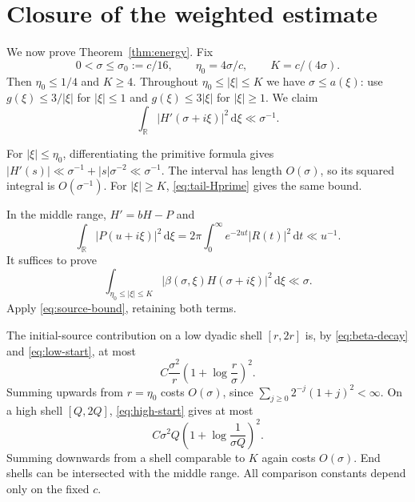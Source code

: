 \documentclass[11pt,letterpaper]{article}
\numberwithin{equation}{section}
\theoremstyle{definition}
\theoremstyle{remark}
\newcommand{\R}{\mathbb R}
\newcommand{\dd}{\,\mathrm d}
\begin{document}
\section{Closure of the weighted estimate}\label{sec:closure}

We now prove Theorem~\ref{thm:energy}. Fix
\begin{equation}\label{eq:threshold}
 0<\sigma\le\sigma_0:=c/16,\qquad
 \eta_0=4\sigma/c,\qquad K=c/(4\sigma).
\end{equation}
Then $\eta_0\le1/4$ and $K\ge4$. Throughout
$\eta_0\le|\xi|\le K$ we have $\sigma\le a(\xi)$: use
$g(\xi)\le3/|\xi|$ for $|\xi|\le1$ and $g(\xi)\le3|\xi|$ for
$|\xi|\ge1$. We claim
\begin{equation}\label{eq:global-Hprime}
 \int_\R|H'(\sigma+i\xi)|^2\dd\xi\ll\sigma^{-1}.
\end{equation}

For $|\xi|\le\eta_0$, differentiating the primitive formula gives
$|H'(s)|\ll\sigma^{-1}+|s|\sigma^{-2}\ll\sigma^{-1}$. The interval has
length $O(\sigma)$, so its squared integral is $O(\sigma^{-1})$.
For $|\xi|\ge K$, \eqref{eq:tail-Hprime} gives the same bound.

In the middle range, $H'=bH-P$ and
\begin{equation}\label{eq:P-L2}
 \int_\R|P(u+i\xi)|^2\dd\xi
 =2\pi\int_0^\infty e^{-2ut}|R(t)|^2\dd t\ll u^{-1}.
\end{equation}
It suffices to prove
\begin{equation}\label{eq:betaH}
 \int_{\eta_0\le|\xi|\le K}|\beta(\sigma,\xi)H(\sigma+i\xi)|^2\dd\xi
 \ll\sigma.
\end{equation}
Apply \eqref{eq:source-bound}, retaining both terms.

The initial-source contribution on a low dyadic shell $[r,2r]$ is, by
\eqref{eq:beta-decay} and \eqref{eq:low-start}, at most
\[
 C\frac{\sigma^2}{r}\left(1+\log\frac r\sigma\right)^2.
\]
Summing upwards from $r=\eta_0$ costs $O(\sigma)$, since
$\sum_{j\ge0}2^{-j}(1+j)^2<\infty$. On a high shell $[Q,2Q]$,
\eqref{eq:high-start} gives at most
\[
 C\sigma^2Q\left(1+\log\frac1{\sigma Q}\right)^2.
\]
Summing downwards from a shell comparable to $K$ again costs $O(\sigma)$.
End shells can be intersected with the middle range. All comparison constants
depend only on the fixed $c$.
\end{document}
